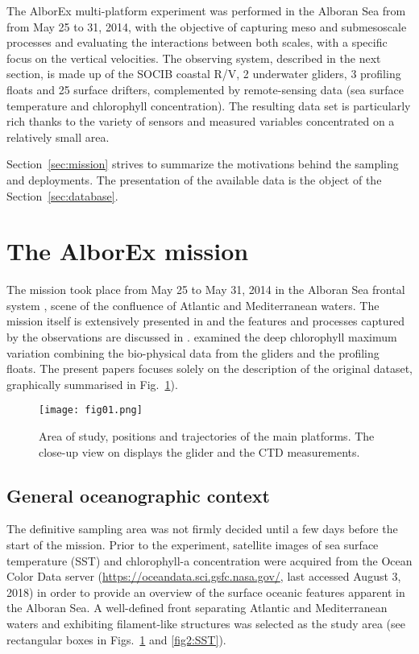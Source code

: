 \documentclass[essd,manuscript]{copernicus}
\begin{document}
The AlborEx multi-platform experiment was performed in the Alboran Sea from from May 25 to 31, 2014, with the objective of capturing meso and submesoscale processes and evaluating the interactions between both scales, with a specific focus on the vertical velocities. The observing system, described in the next section, is made up of the SOCIB coastal R/V, 2 underwater gliders, 3 profiling floats and 25 surface drifters, complemented by remote-sensing data (sea surface temperature and chlorophyll concentration). The resulting data set is particularly rich thanks to the variety of sensors and measured variables concentrated on a relatively small area.

Section~\ref{sec:mission} strives to summarize the motivations behind the sampling and deployments. The presentation of the available data is the object of the Section~\ref{sec:database}.

\section{The AlborEx mission\label{sec:mission}}

The mission took place from May 25 to May 31, 2014 in the Alboran Sea frontal system \citep[][see Fig.~\ref{fig1:general}]{CHENEY78,TINTORE91}, scene of the confluence of Atlantic and Mediterranean waters. The mission itself is extensively presented in \citet{RUIZ2015} and the features and processes captured by the observations are discussed in \citet{PASCUAL2017}. \citet{OLITA17} examined the deep chlorophyll maximum variation combining the bio-physical data from the gliders and the profiling floats. The present papers focuses solely on the description of the original dataset, graphically summarised in Fig.~\ref{fig1:general}).

\begin{figure}[t]
\texttt{[image: fig01.png]}
\caption{Area of study, positions and trajectories of the main platforms. The close-up view on displays the glider and the CTD measurements.\label{fig1:general}}
\end{figure}

\subsection{General oceanographic context}

The definitive sampling area was not firmly decided until a few days before the start of the mission. Prior to the experiment, satellite images of sea surface temperature (SST) and chlorophyll-a concentration were acquired from the Ocean Color Data server (\url{https://oceandata.sci.gsfc.nasa.gov/}, last accessed August 3, 2018) in order to provide an overview of the surface oceanic features apparent in the Alboran Sea. A well-defined front separating Atlantic and Mediterranean waters and exhibiting filament-like structures was selected as the study area (see rectangular boxes in Figs.~\ref{fig1:general} and \ref{fig2:SST}). 
\end{document}
